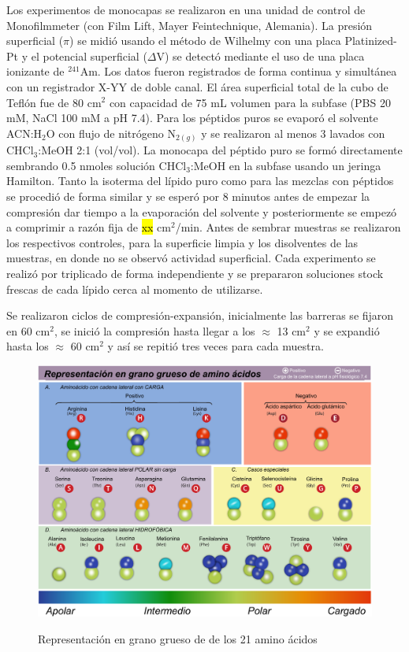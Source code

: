 \begin{appendix}
Los experimentos de monocapas se realizaron en una unidad de control de Monofilmmeter (con Film Lift, Mayer Feintechnique, Alemania). La presión superficial ($\pi$) se midió usando el método de Wilhelmy con una placa Platinized-Pt y el potencial superficial ($\Delta$V) se detectó mediante el uso de una placa ionizante de $^{241}$Am. Los datos fueron registrados de forma continua y simultánea con un registrador X-YY de doble canal. El área superficial total de la cubo de Teflón fue de 80 cm$^2$ con capacidad de 75 mL volumen para la subfase (PBS 20 mM, NaCl 100 mM a pH 7.4). Para los péptidos puros se evaporó el solvente ACN:H$_2$O con flujo de nitrógeno N$_{2 (g)}$ y se realizaron al menos 3 lavados con CHCl$_3$:MeOH 2:1 (vol/vol). La monocapa del péptido puro se formó directamente sembrando 0.5 nmoles  solución CHCl$_3$:MeOH  en la subfase usando un jeringa Hamilton. Tanto la isoterma del lípido puro como para las mezclas con péptidos se procedió de forma similar y se esperó por 8 minutos antes de empezar la compresión dar tiempo a la evaporación del solvente y posteriormente se empezó a comprimir a razón fija de \hl{xx} cm$^2$/min. Antes de sembrar muestras se realizaron los respectivos controles, para la superficie limpia y los disolventes de las muestras, en donde no se observó actividad superficial. Cada experimento se realizó por triplicado de forma independiente y se prepararon soluciones stock frescas de cada lípido cerca al momento de utilizarse.

Se realizaron ciclos de compresión-expansión, inicialmente las barreras se fijaron en 60 cm$^2$, se inició la compresión hasta llegar a los $\approx$ 13 cm$^2$ y se expandió hasta los $\approx$ 60 cm$^2$ y así se repitió tres veces para cada muestra.



\begin{figure}[]
    \centering
	\includegraphics[width=1\linewidth, height=0.99\textheight, keepaspectratio]{fig/04_anexos/cg_aa.pdf} 
\caption[Representación en grano grueso de de los 21 amino ácidos]{Representación en grano grueso de de los 21 amino ácidos}
    \label{tab:tabla_cg_aa}
\end{figure}





\end{appendix}
